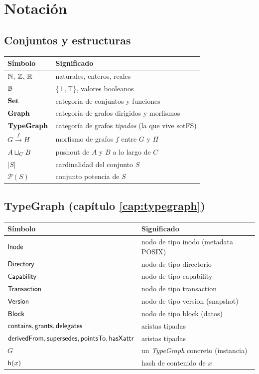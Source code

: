 \chapter*{Notación}

\section*{Conjuntos y estructuras}

\begin{tabularx}{\linewidth}{l X}
  \toprule
  Símbolo & Significado \\
  \midrule
  $\mathbb{N}$, $\mathbb{Z}$, $\mathbb{R}$ & naturales, enteros, reales \\
  $\mathbb{B}$ & $\{\bot, \top\}$, valores booleanos \\
  $\mathbf{Set}$ & categoría de conjuntos y funciones \\
  $\mathbf{Graph}$ & categoría de grafos dirigidos y morfismos \\
  $\mathbf{TypeGraph}$ & categoría de grafos \emph{tipados} (la que vive sotFS) \\
  $G \xrightarrow{f} H$ & morfismo de grafos $f$ entre $G$ y $H$ \\
  $A \mathbin{\sqcup}_C B$ & pushout de $A$ y $B$ a lo largo de $C$ \\
  $|S|$ & cardinalidad del conjunto $S$ \\
  $\mathcal{P}(S)$ & conjunto potencia de $S$ \\
  \bottomrule
\end{tabularx}

\section*{TypeGraph (capítulo \ref{cap:typegraph})}

\begin{tabularx}{\linewidth}{l X}
  \toprule
  Símbolo & Significado \\
  \midrule
  $\textsf{Inode}$ & nodo de tipo inodo (metadata POSIX) \\
  $\textsf{Directory}$ & nodo de tipo directorio \\
  $\textsf{Capability}$ & nodo de tipo capability \\
  $\textsf{Transaction}$ & nodo de tipo transaction \\
  $\textsf{Version}$ & nodo de tipo version (snapshot) \\
  $\textsf{Block}$ & nodo de tipo block (datos) \\
  $\textsf{contains}, \textsf{grants}, \textsf{delegates}$ & aristas tipadas \\
  $\textsf{derivedFrom}, \textsf{supersedes}, \textsf{pointsTo}, \textsf{hasXattr}$ & aristas tipadas \\
  $G$ & un \emph{TypeGraph} concreto (instancia) \\
  $\mathsf{h}(x)$ & hash de contenido \blake{} de $x$ \\
  \bottomrule
\end{tabularx}

